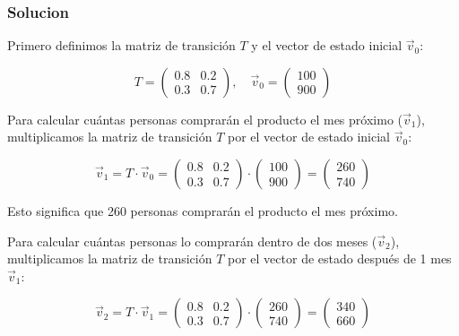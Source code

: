 \documentclass{article}
\begin{document}
\subsubsection*{Solucion}

Primero definimos la matriz de transición \(T\) y el vector de estado inicial \(\vec{v}_0\):

\[
    T = \begin{pmatrix}
        0.8 & 0.2 \\
        0.3 & 0.7
    \end{pmatrix},
    \quad
    \vec{v}_0 = \begin{pmatrix}
        100 \\
        900
    \end{pmatrix}
\]

Para calcular cuántas personas comprarán el producto el mes próximo (\(\vec{v}_1\)), multiplicamos la matriz de transición \(T\) por el vector de estado inicial \(\vec{v}_0\):

\[
    \vec{v}_1 = T \cdot \vec{v}_0 = \begin{pmatrix}
        0.8 & 0.2 \\
        0.3 & 0.7
    \end{pmatrix}
    \cdot
    \begin{pmatrix}
        100 \\
        900
    \end{pmatrix}
    =
    \begin{pmatrix}
        260 \\
        740
    \end{pmatrix}
\]

Esto significa que 260 personas comprarán el producto el mes próximo.

Para calcular cuántas personas lo comprarán dentro de dos meses (\(\vec{v}_2\)), multiplicamos la matriz de transición \(T\) por el vector de estado después de 1 mes \(\vec{v}_1\):

\[
    \vec{v}_2 = T \cdot \vec{v}_1 = \begin{pmatrix}
        0.8 & 0.2 \\
        0.3 & 0.7
    \end{pmatrix}
    \cdot
    \begin{pmatrix}
        260 \\
        740
    \end{pmatrix}
    =
    \begin{pmatrix}
        340 \\
        660
    \end{pmatrix}
\]
\end{document}
